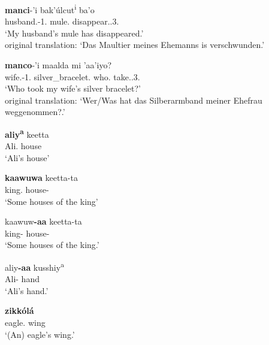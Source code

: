 \begin{exe}\ex\label{KabGen} 
\begin{xlist} 
\ex\gll \textbf{manci}-'i bak'\'ulcut\textsuperscript{i} ba'o\\
husband.\gen{}-1\sg{}.\poss{} mule.\nom{} disappear.\pfv{}.3\sg{}.\fem{}\\
\glt `My husband's mule has disappeared.'\\
 original translation: `Das Maultier meines Ehemanns is verschwunden.'

\ex\gll \textbf{manco}-'i maalda mi 'aa'iyo?\\
wife.\gen{}-1\sg{}.\poss{} silver\_bracelet.\acc{} who.\nom{} take.\pfv{}.3\sg{}.\mas{}\\
\glt `Who took my wife's silver bracelet?'\\
 original translation: `Wer/Was hat das Silberarmband meiner Ehefrau weggenommen?.'
\end{xlist}
\end{exe}  


\begin{exe}\ex\label{WolGen}
\begin{xlist}
\ex\gll \textbf{aliy\textsuperscript{a}} keetta\\
Ali.\gen{} house\\
\glt `Ali's house'

\ex\gll \textbf{kaawuwa} keetta-ta\\
king.\gen{} house-\pl{}\\
\glt `Some houses of the king'

\ex\gll kaawuw\textbf{-aa} keetta-ta\\
king-\gen{} house-\pl{}\\
\glt `Some houses of the king.'

\ex\gll aliy\textbf{-aa} kusshiy\textsuperscript{a}\\
Ali-\gen{} hand\\
\glt `Ali's hand.'
\end{xlist}
\end{exe}

\enlargethispage{2\baselineskip}
\begin{exe} \ex\label{ZayGen}
\gll \textbf{zikk\'ol\'a} \\
eagle.\gen{} wing\\
\glt `(An) eagle's wing.'
\end{exe}


